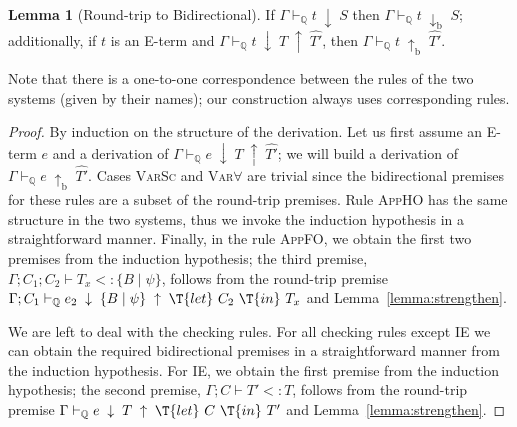 \documentclass[10pt,preprint]{sigplanconf-pldi16}
\theoremstyle{definition}
\newtheorem{lemma}{Lemma}
\newcommand{\Subt}{<:}
\newcommand{\env}{\Gamma}
\newcommand{\produce}{\;\uparrow\;}
\newcommand{\consume}{\;\downarrow\;}
\newcommand{\produceB}{\;{\mathrm{\uparrow_b}}\;}
\newcommand{\consumeB}{\;{\mathrm{\downarrow_b}}\;}
\newcommand{\contT}[2]{\T{let}\ {#1}\ \T{in}\ {#2}}
\newcommand{\quals}{\mathbb{Q}}
\newcommand{\entailsQ}{\vdash_{\quals}}
\begin{document}
\begin{lemma}[Round-trip to Bidirectional]\label{lemma:rt-to-bidir}
If $\env \entailsQ t \consume S$ then $\env \entailsQ t \consumeB S$;
additionally, if $t$ is an E-term and $\env \entailsQ t \consume T \produce \hat{T'}$,
then $\env \entailsQ t \produceB \hat{T'}$.
\end{lemma}
Note that there is a one-to-one correspondence between the rules of the two systems (given by their names);
our construction always uses corresponding rules.
\begin{proof}
By induction on the structure of the derivation.
Let us first assume an E-term $e$ and a derivation of $\env \entailsQ e \consume T \produce \hat{T'}$;
we will build a derivation of $\env \entailsQ e \produceB \hat{T'}$.
Cases \textsc{VarSc} and \textsc{Var$\forall$} are trivial
since the bidirectional premises for these rules are a subset of the round-trip premises.
Rule \textsc{AppHO} has the same structure in the two systems,
thus we invoke the induction hypothesis in a straightforward manner.
Finally, in the rule \textsc{AppFO}, we obtain the first two premises from the induction hypothesis;
the third premise, $\env;C_1;C_2 \vdash T_x \Subt \{B \mid \psi\}$,
follows from the round-trip premise $\env;C_1 \entailsQ e_2 \consume \{B \mid \psi\} \produce \contT{C_2}{T_x}$
and Lemma~\ref{lemma:strengthen}.

We are left to deal with the checking rules.
For all checking rules except \textsc{IE} we can obtain the required bidirectional premises
in a straightforward manner from the induction hypothesis.
For \textsc{IE}, we obtain the first premise from the induction hypothesis;
the second premise, $\env;C \vdash T' \Subt T$,
follows from the round-trip premise $\env \entailsQ e \consume T \produce \contT{C}{T'}$
and Lemma~\ref{lemma:strengthen}.
\end{proof}
\end{document}
